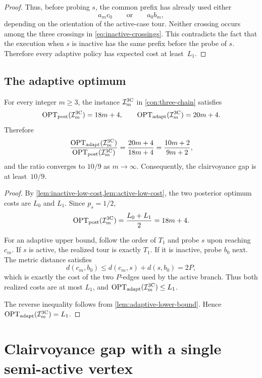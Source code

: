 \documentclass[12pt,a4paper,oneside]{report}
\begin{document}
\begin{proof}
Thus, before probing $s$, the common prefix has already used either
\[
  a_mc_0
  \qquad\text{or}\qquad
  a_0b_m,
\]
depending on the orientation of the active-case tour.  Neither crossing occurs
among the three crossings in \cref{eq:inactive-crossings}.  This contradicts
the fact that the execution when $s$ is inactive has the same prefix before
the probe of $s$.  Therefore every adaptive policy has expected cost at
least~$L_1$.
\end{proof}

\subsection{The adaptive optimum}\label{sec:three-chain-adaptive-optimum}

\begin{theorem}\label{thm:three-chain-cost}
For every integer $m\ge3$, the instance $\mathcal{I}_{m}^{\mathrm{3C}}$ in
\cref{con:three-chain} satisfies
\[
  \operatorname{OPT}_\mathrm{post}(\mathcal{I}_{m}^{\mathrm{3C}})=18m+4,
  \qquad
  \operatorname{OPT}_\mathrm{adapt}(\mathcal{I}_{m}^{\mathrm{3C}})=20m+4.
\]
Therefore
\[
  \frac{\operatorname{OPT}_\mathrm{adapt}(\mathcal{I}_{m}^{\mathrm{3C}})}
       {\operatorname{OPT}_\mathrm{post}(\mathcal{I}_{m}^{\mathrm{3C}})}
  =\frac{20m+4}{18m+4}
  =\frac{10m+2}{9m+2},
\]
and the ratio converges to $10/9$ as $m\to\infty$.  Consequently, the
clairvoyance gap is at least~$10/9$.
\end{theorem}

\begin{proof}
By \cref{lem:inactive-low-cost,lem:active-low-cost}, the two posterior optimum
costs are $L_0$ and $L_1$.  Since $p_s=1/2$,
\[
  \operatorname{OPT}_\mathrm{post}(\mathcal{I}_{m}^{\mathrm{3C}})
  =\frac{L_0+L_1}{2}=18m+4.
\]

For an adaptive upper bound, follow the order of $T_1$ and probe $s$ upon
reaching $c_m$.  If $s$ is active, the realized tour is exactly $T_1$.  If it
is inactive, probe $b_0$ next.  The metric distance satisfies
\[
  d(c_m,b_0)\le d(c_m,s)+d(s,b_0)=2P,
\]
which is exactly the cost of the two $P$-edges used by the active branch.
Thus both realized costs are at most $L_1$, and
$\operatorname{OPT}_\mathrm{adapt}(\mathcal{I}_{m}^{\mathrm{3C}})\le L_1$.

The reverse inequality follows from \cref{lem:adaptive-lower-bound}.  Hence
$\operatorname{OPT}_\mathrm{adapt}(\mathcal{I}_{m}^{\mathrm{3C}})=L_1$.
\end{proof}

\section{Clairvoyance gap with a single semi-active vertex}
\label{sec:one-stochastic-upper-bound}
\end{document}
